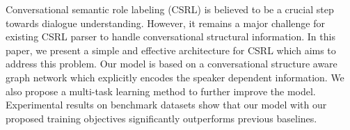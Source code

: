 Conversational semantic role labeling (CSRL) is believed to be a crucial step towards dialogue understanding. However, it remains a major challenge for existing CSRL parser to handle conversational structural information. In this paper, we present a simple and effective architecture for CSRL which aims to address this problem. Our model is based on a conversational structure aware graph network which explicitly encodes the speaker dependent information. We also propose a multi-task learning method to further improve the model. Experimental results on benchmark datasets show that our model with our proposed training objectives significantly outperforms previous baselines.
